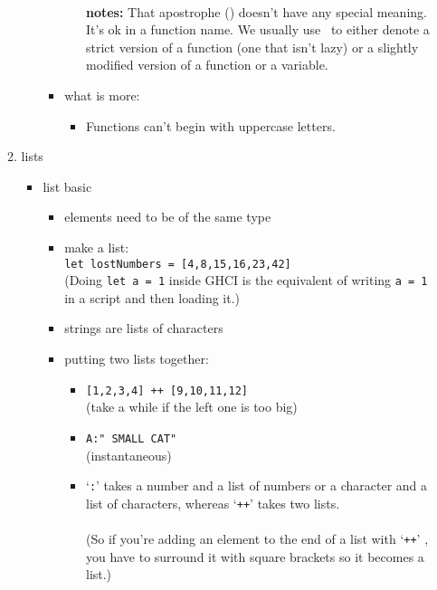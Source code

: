 \documentclass[a4paper,10pt]{article}
\begin{document}
\begin{enumerate}
\begin{enumerate}
\begin{itemize}
\begin{itemize}
\begin{itemize}
    \\\textbf{notes:} That apostrophe (\textquotesingle) doesn't have any special meaning. It's ok in a function name. We usually use \textquotesingle \ to either denote a strict version of a function (one that isn't lazy) or a slightly modified version of a function or a
variable.\\
   \end{itemize}
   \item what is more:
   \begin{itemize}
    \item Functions can't begin with uppercase letters.
   \end{itemize}
  \end{itemize}
  \end{itemize}
  \item lists
  \begin{itemize}
   \item list basic
  \begin{itemize}
   \item elements need to be of the same type
   \item make a list:
   \\\texttt{let lostNumbers = [4,8,15,16,23,42]}
   \\(Doing \texttt{let a = 1} inside GHCI is the equivalent of writing \texttt{a = 1} in a script and then loading it.)
   \item  strings are lists of characters
   \item putting two lists together:
   \begin{itemize}
    \item \texttt{[1,2,3,4] ++ [9,10,11,12]}
    \\(take a while if the left one is too big)
    \\\item \texttt{\textquotesingle A\textquotesingle:" SMALL CAT"}
    \\(instantaneous)
    \\\item `\texttt{:}' takes a number and a list of numbers or a character and a list of characters, whereas `\texttt{++}' takes two lists. 
    \\\\(So if you're adding an element to the end of a list with `\texttt{++}' , you have to surround it with square brackets so it becomes a list.)

\end{itemize}
\end{itemize}
\end{itemize}
\end{enumerate}
\end{enumerate}
\end{document}
